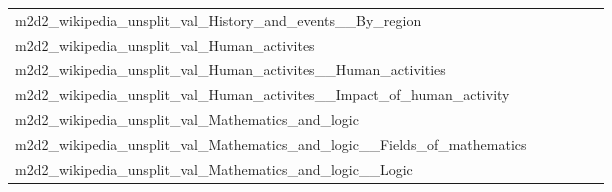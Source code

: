 \documentclass[dvipsnames]{article}
\begin{document}
\begin{appendix}
{\begin{longtable}{m{6cm}m{1.7cm}m{1.7cm}m{1.7cm}m{1.7cm}m{1.7cm}}
	m2d2\_wikipedia\_unsplit\_val\_History\_and\_events\_\_By\_region  & \colorbox[HTML]{fefee3}{\makebox[\mywidth][c]{12.36}} & \colorbox[HTML]{ecf7b1}{\makebox[\mywidth][c]{11.88}} & \colorbox[HTML]{ffffe5}{\makebox[\mywidth][c]{12.87}} & \colorbox[HTML]{d7efa2}{\makebox[\mywidth][c]{11.79}} & \colorbox[HTML]{77c578}{\makebox[\mywidth][c]{11.64}}\\
	m2d2\_wikipedia\_unsplit\_val\_Human\_activites  & \colorbox[HTML]{fefee2}{\makebox[\mywidth][c]{12.43}} & \colorbox[HTML]{e9f6af}{\makebox[\mywidth][c]{12.03}} & \colorbox[HTML]{ffffe5}{\makebox[\mywidth][c]{12.98}} & \colorbox[HTML]{d1ec9f}{\makebox[\mywidth][c]{11.95}} & \colorbox[HTML]{77c578}{\makebox[\mywidth][c]{11.81}}\\
	m2d2\_wikipedia\_unsplit\_val\_Human\_activites\_\_Human\_activities  & \colorbox[HTML]{fefee2}{\makebox[\mywidth][c]{12.43}} & \colorbox[HTML]{e9f6af}{\makebox[\mywidth][c]{12.03}} & \colorbox[HTML]{ffffe5}{\makebox[\mywidth][c]{12.98}} & \colorbox[HTML]{d1ec9f}{\makebox[\mywidth][c]{11.95}} & \colorbox[HTML]{77c578}{\makebox[\mywidth][c]{11.81}}\\
	m2d2\_wikipedia\_unsplit\_val\_Human\_activites\_\_Impact\_of\_human\_activity  & \colorbox[HTML]{fefee0}{\makebox[\mywidth][c]{12.47}} & \colorbox[HTML]{e8f6ae}{\makebox[\mywidth][c]{12.05}} & \colorbox[HTML]{ffffe5}{\makebox[\mywidth][c]{13.12}} & \colorbox[HTML]{dcf1a5}{\makebox[\mywidth][c]{12.00}} & \colorbox[HTML]{77c578}{\makebox[\mywidth][c]{11.82}}\\
	m2d2\_wikipedia\_unsplit\_val\_Mathematics\_and\_logic  & \colorbox[HTML]{fcfed8}{\makebox[\mywidth][c]{12.90}} & \colorbox[HTML]{e0f2a8}{\makebox[\mywidth][c]{12.51}} & \colorbox[HTML]{ffffe5}{\makebox[\mywidth][c]{13.79}} & \colorbox[HTML]{d8efa2}{\makebox[\mywidth][c]{12.48}} & \colorbox[HTML]{77c578}{\makebox[\mywidth][c]{12.29}}\\
	m2d2\_wikipedia\_unsplit\_val\_Mathematics\_and\_logic\_\_Fields\_of\_mathematics  & \colorbox[HTML]{dbf1a4}{\makebox[\mywidth][c]{8.24}} & \colorbox[HTML]{e0f2a8}{\makebox[\mywidth][c]{8.26}} & \colorbox[HTML]{ffffe5}{\makebox[\mywidth][c]{9.37}} & \colorbox[HTML]{e5f4ab}{\makebox[\mywidth][c]{8.28}} & \colorbox[HTML]{77c578}{\makebox[\mywidth][c]{8.06}}\\
	m2d2\_wikipedia\_unsplit\_val\_Mathematics\_and\_logic\_\_Logic  & \colorbox[HTML]{fdfedb}{\makebox[\mywidth][c]{13.21}} & \colorbox[HTML]{e3f4aa}{\makebox[\mywidth][c]{12.87}} & \colorbox[HTML]{ffffe5}{\makebox[\mywidth][c]{13.90}} & \colorbox[HTML]{def2a6}{\makebox[\mywidth][c]{12.85}} & \colorbox[HTML]{77c578}{\makebox[\mywidth][c]{12.67}}\\

\end{longtable}}
\end{appendix}
\end{document}
